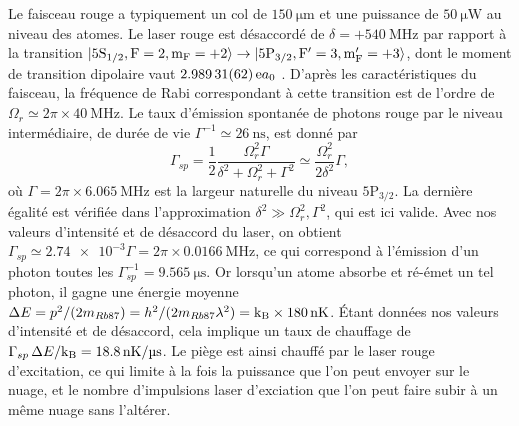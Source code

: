 Le faisceau rouge a typiquement un col de $\SI{150}{\um}$ et une puissance de $\SI{50}{\micro\watt}$ au niveau des atomes.
Le laser rouge est désaccordé de $\delta=+\SI{540}{\MHz}$ par rapport à la transition $ \ket{\mathrm{5S_{1/2},F=2,m_F=+2}} \rightarrow \ket{\mathrm{5P_{3/2},F'=3,m_F'=+3}}$, dont le moment de transition dipolaire vaut $\SI{2.98931 (62)} ea_0$ \cite{DATA_STECKRB87}.
D'après les caractéristiques du faisceau, la fréquence de Rabi correspondant à cette transition est de l'ordre de $\Omega_r \simeq 2\pi\times \SI{40}{\MHz}$.
Le taux d'émission spontanée de photons rouge par le niveau intermédiaire, de durée de vie $\Gamma^{-1} \simeq \SI{26}{\ns}$, est donné par
\begin{equation}
\label{eq:scattering_5P3/2}
\Gamma_{sp} = \frac{1}{2} \frac{\Omega_r^2 \Gamma}{\delta^2 + \Omega_r^2 + \Gamma^2}
\simeq \frac{\Omega_r^2}{2\delta^2} \Gamma,
\end{equation}
où $\Gamma = 2\pi \times \SI{6.065}{\MHz}$ est la largeur naturelle du niveau $\mathrm{5P_{3/2}}$.
La dernière égalité est vérifiée dans l'approximation $\delta^2 \gg \Omega_r^2, \Gamma^2$, qui est ici valide.
Avec nos valeurs d'intensité et de désaccord du laser, on obtient $\Gamma_{sp} \simeq \num{2.74e-3} \Gamma = 2\pi\times \SI{0.0166}{\MHz}$, ce qui correspond à l'émission d'un photon  toutes les $\Gamma_{sp}^{-1} = \SI{9.565}{\us}$.
Or lorsqu'un atome absorbe et ré-émet un tel photon, il gagne une énergie moyenne
$\Delta E = p^2/(2m_{Rb87}) = h^2/(2m_{Rb87} \lambda^2) = \mathrm{k_B}\times\SI{180}{\nano\kelvin}$.
Étant données nos valeurs d'intensité et de désaccord, cela implique un taux de chauffage de $\Gamma_{sp}\,\Delta E /\kb = \SI{18.8}{\nano\K/\us}$.
Le piège est ainsi chauffé par le laser rouge d'excitation, ce qui limite à la fois la puissance que l'on peut envoyer sur le nuage, et le nombre d'impulsions laser d'exciation que l'on peut faire subir à un même nuage sans l'altérer.

